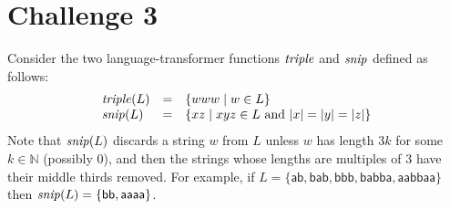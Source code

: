 \documentclass[11pt]{article}
\newcommand{\id}[1]{\mbox{\textit{#1}}}
\newcommand{\ma}{\mathsf{a}}
\newcommand{\mb}{\mathsf{b}}
\begin{document}
\section*{Challenge 3}
Consider the two language-transformer functions $\id{triple}$ and 
$\id{snip}$ defined as follows:
\[
\begin{array}{lcl}
   \id{triple}(L) &=& \{w w w \mid w \in L\}
\\ \id{snip}(L) &=& \{ xz \mid x y z \in L \mbox{ and } |x| = |y| = |z|\}
\end{array}
\]
Note that $\id{snip}(L)$ discards a string $w$ from $L$ unless $w$
has length $3k$ for some $k \in \mathbb{N}$ (possibly 0), and then
the strings whose lengths are multiples of 3 have their middle
thirds removed.
For example, if 
$L= \{\ma\mb,\mb\ma\mb,\mb\mb\mb,\mb\ma\mb\mb\ma,\ma\ma\mb\mb\ma\ma\}$
then $\id{snip}(L) = \{\mb\mb,\ma\ma\ma\ma\}$.
\end{document}
